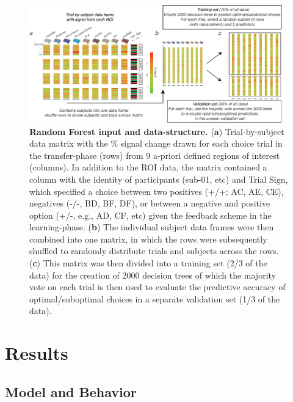 \documentclass[]{article}
\begin{document}
\begin{figure}
\centering
\includegraphics{_png/Figure5.png}
\caption{\textbf{Random Forest input and data-structure.} (\textbf{a})
Trial-by-subject data matrix with the \(\%\) signal change drawn for
each choice trial in the transfer-phase (rows) from \(9\) a-priori
defined regions of interest (columns). In addition to the ROI data, the
matrix contained a column with the identity of participants (sub-01,
etc) and Trial Sign, which specified a choice between two positives
(+/+; AC, AE, CE), negatives (-/-, BD, BF, DF), or between a negative
and positive option (+/-, e.g., AD, CF, etc) given the feedback scheme
in the learning-phase. (\textbf{b}) The individual subject data frames
were then combined into one matrix, in which the rows were subsequently
shuffled to randomly distribute trials and subjects across the rows.
(\textbf{c}) This matrix was then divided into a training set (2/3 of
the data) for the creation of 2000 decision trees of which the majority
vote on each trial is then used to evaluate the predictive accuracy of
optimal/suboptimal choices in a separate validation set (1/3 of the
data). \label{Figure 2}}
\end{figure}

\hypertarget{results}{%
\section{Results}\label{results}}

\hypertarget{model-and-behavior}{%
\subsection{Model and Behavior}\label{model-and-behavior}}
\end{document}
